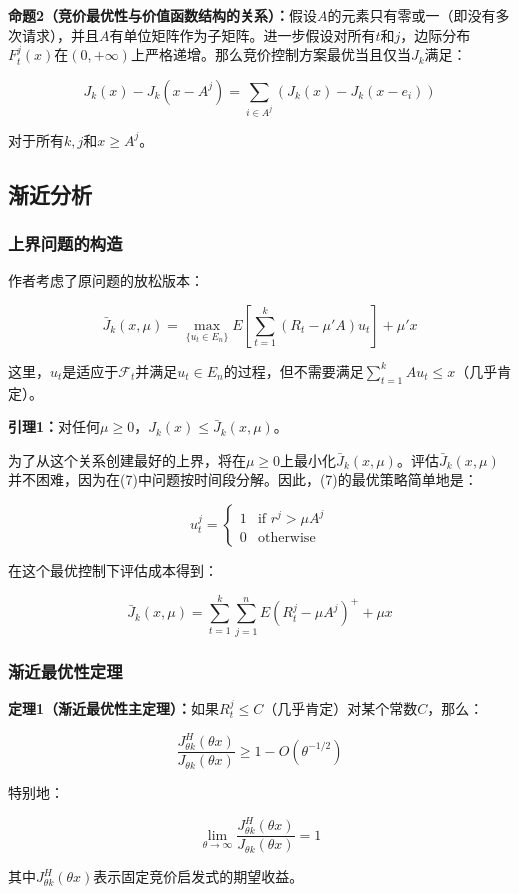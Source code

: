 \documentclass[
  10pt
]{article}
\begin{document}
\begin{propositionbox}
\textbf{命题2（竞价最优性与价值函数结构的关系）：}假设$A$的元素只有零或一（即没有多次请求），并且$A$有单位矩阵作为子矩阵。进一步假设对所有$t$和$j$，边际分布$F_t^j(x)$在$(0, +\infty)$上严格递增。那么竞价控制方案最优当且仅当$J_k$满足：

$$J_k(x) - J_k(x - A^j) = \sum_{i \in A^j} (J_k(x) - J_k(x - e_i))$$

对于所有$k, j$和$x \geq A^j$。
\end{propositionbox}

\subsection{渐近分析}

\subsubsection{上界问题的构造}

作者考虑了原问题的放松版本：

$$\bar{J}_k(x,\mu) = \max_{\{u_t \in E_n\}} E\left[\sum_{t=1}^k (R_t - \mu' A) u_t\right] + \mu' x$$

这里，$u_t$是适应于$\mathcal{F}_t$并满足$u_t \in E_n$的过程，但不需要满足$\sum_{t=1}^k A u_t \leq x$（几乎肯定）。

\textbf{引理1：}对任何$\mu \geq 0$，$J_k(x) \leq \bar{J}_k(x,\mu)$。

为了从这个关系创建最好的上界，将在$\mu \geq 0$上最小化$\bar{J}_k(x,\mu)$。评估$\bar{J}_k(x,\mu)$并不困难，因为在(7)中问题按时间段分解。因此，(7)的最优策略简单地是：

$$u_t^j = \begin{cases}
1 & \text{if } r^j > \mu A^j \\
0 & \text{otherwise}
\end{cases}$$

在这个最优控制下评估成本得到：

$$\bar{J}_k(x,\mu) = \sum_{t=1}^k \sum_{j=1}^n E(R_t^j - \mu A^j)^+ + \mu x$$

\subsubsection{渐近最优性定理}

\begin{theorembox}
\textbf{定理1（渐近最优性主定理）：}如果$R_t^j \leq C$（几乎肯定）对某个常数$C$，那么：

$$\frac{J_{\theta k}^H(\theta x)}{J_{\theta k}(\theta x)} \geq 1 - O(\theta^{-1/2})$$

特别地：

$$\lim_{\theta \to \infty} \frac{J_{\theta k}^H(\theta x)}{J_{\theta k}(\theta x)} = 1$$

其中$J_{\theta k}^H(\theta x)$表示固定竞价启发式的期望收益。
\end{theorembox}
\end{document}
